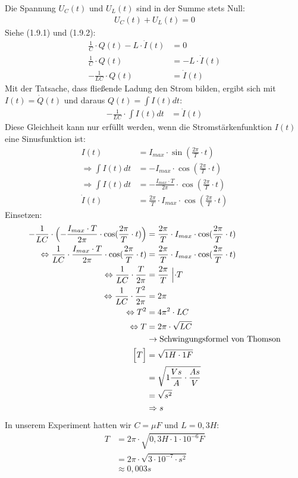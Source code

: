 \documentclass[12pt, a4paper]{report}
\begin{document}
	\noindent
	Die Spannung $U_C(t)$ und $U_L(t)$ sind in der Summe stets Null:
	\begin{align*}
		U_C(t) + U_L(t) = 0
	\end{align*}
	Siehe (1.9.1) und (1.9.2):
	\begin{align*}
		\frac{1}{C} \cdot Q(t) - L\cdot \dot I(t) &= 0 \\
		\frac{1}{C} \cdot Q(t) &= -L\cdot \dot I(t) \\
		-\frac{1}{LC} \cdot Q(t) &= \dot I(t)
	\end{align*}
	Mit der Tatsache, dass fließende Ladung den Strom bilden, ergibt sich mit $I(t) = \dot Q(t)$ und daraus $Q(t) = \int I(t) dt$:
	\begin{align*}
		-\frac{1}{LC} \cdot \int I(t) dt &= \dot I(t)
	\end{align*}
	Diese Gleichheit kann nur erfüllt werden, wenn die Stromstärkenfunktion $I(t)$ eine Sinusfunktion ist:
	\begin{align*}
		I(t) &= I_{max} \cdot \sin(\frac{2\pi}{T}\cdot t) \\
		\Rightarrow \int I(t) dt &= -I_{max} \cdot \cos(\frac{2\pi}{T}\cdot t) \\
		\Rightarrow \int I(t) dt &= -\frac{I_{max} \cdot T}{2\pi} \cdot \cos(\frac{2\pi}{T}\cdot t) \\
		\dot I(t) &= \frac{2\pi}{T} \cdot I_{max} \cdot \cos(\frac{2\pi}{T}\cdot t)
	\end{align*}
	Einsetzen:
	\begin{align*}
		-\frac{1}{LC} \cdot \Bigl(-\frac{I_{max}\cdot T}{2\pi} \cdot \cos(\frac{2\pi}{T}\cdot t)\Bigl) &= \frac{2\pi}{T}\cdot I_{max} \cdot \cos(\frac{2\pi}{T}\cdot t) \\
		\Leftrightarrow \frac{1}{LC} \cdot \frac{I_{max}\cdot T}{2\pi} \cdot \cos(\frac{2\pi}{T}\cdot t) &= \frac{2\pi}{T} \cdot I_{max} \cdot \cos(\frac{2\pi}{T}\cdot t) \\
		\Leftrightarrow \frac{1}{LC} \cdot \frac{T}{2\pi} &= \frac{2\pi}{T}\ \Bigl|\cdot T \\
		\Leftrightarrow \frac{1}{LC} \cdot \frac{T^2}{2\pi} &= 2\pi\\
		\Leftrightarrow T^2 &= 4\pi^2 \cdot LC\\
		\Leftrightarrow T &= 2\pi \cdot \sqrt{LC}\\
		&\to \text{Schwingungsformel von Thomson} \\
		\Bigl[T\Bigl] &= \sqrt{1H \cdot 1F} \\
		&= \sqrt{1\frac{Vs}{A} \cdot \frac{As}{V}} \\
		&= \sqrt{s^2} \\
		&\Rightarrow s
	\end{align*}
	In unserem Experiment hatten wir $C=\mu F$ und $L = 0,3 H$: \\
	\begin{align*}
		T &= 2\pi \cdot \sqrt{0,3H \cdot 1 \cdot 10^{-6}F} \\
		&= 2\pi \cdot \sqrt{3 \cdot 10^{-7} \cdot s^2} \\
		&\approx 0,003s
	\end{align*}
\end{document}
